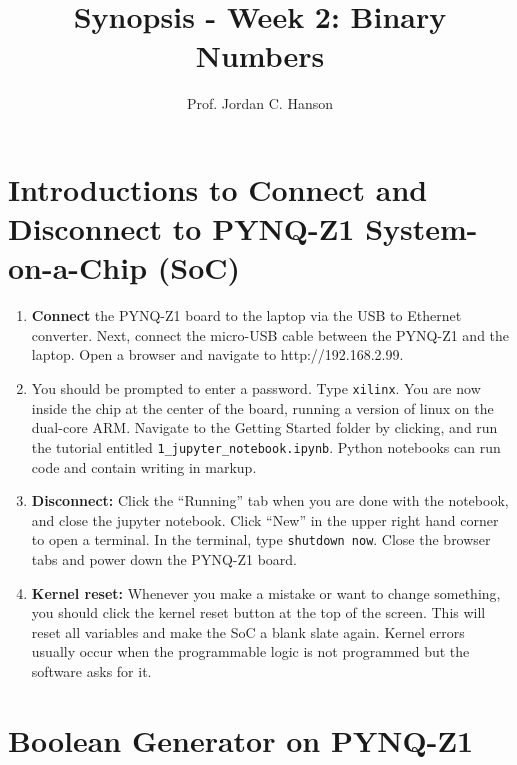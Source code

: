 \documentclass{article}
\begin{document}
\title{Synopsis - Week 2: Binary Numbers}
\author{Prof. Jordan C. Hanson}

\maketitle

\section{Introductions to Connect and Disconnect to PYNQ-Z1 System-on-a-Chip (SoC)}

\begin{enumerate}
\item \textbf{Connect} the PYNQ-Z1 board to the laptop via the USB to Ethernet converter.  Next, connect the micro-USB cable between the PYNQ-Z1 and the laptop.  Open a browser and navigate to http://192.168.2.99.
\item You should be prompted to enter a password.  Type \verb+xilinx+.  You are now inside the chip at the center of the board, running a version of linux on the dual-core ARM.  Navigate to the Getting Started folder by clicking, and run the tutorial entitled \verb+1_jupyter_notebook.ipynb+.  Python notebooks can run code and contain writing in markup.
\item \textbf{Disconnect:} Click the ``Running'' tab when you are done with the notebook, and close the jupyter notebook.  Click ``New'' in the upper right hand corner to open a terminal.  In the terminal, type \verb+shutdown now+.  Close the browser tabs and power down the PYNQ-Z1 board.
\item \textbf{Kernel reset:}  Whenever you make a mistake or want to change something, you should click the kernel reset button at the top of the screen.  This will reset all variables and make the SoC a blank slate again.  Kernel errors usually occur when the programmable logic is not programmed but the software asks for it.
\end{enumerate}

\section{Boolean Generator on PYNQ-Z1}
\end{document}
